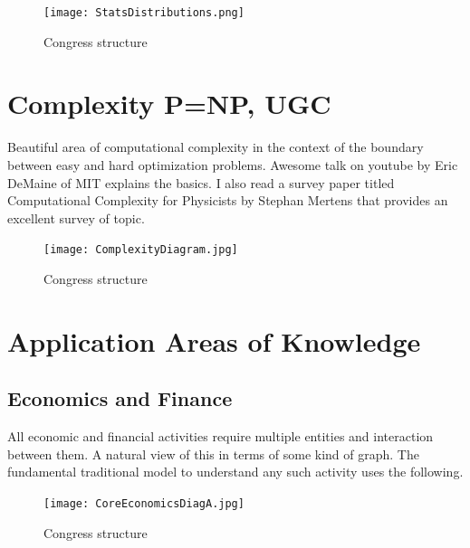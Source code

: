 \documentclass[11pt]{amsart}
\begin{document}
\begin{figure}[H]
\centering
  \texttt{[image: StatsDistributions.png]}
  \caption{Congress structure}
  \label{fig:congress}
\end{figure}

\section{Complexity P=NP, UGC}
Beautiful area of computational complexity in the context of the boundary between easy and hard optimization problems. Awesome talk on youtube by Eric DeMaine of MIT explains the basics. I also read a survey paper titled Computational Complexity for Physicists by Stephan Mertens that provides an excellent survey of topic. 

\begin{figure}[H]
\centering
  \texttt{[image: ComplexityDiagram.jpg]}
  \caption{Congress structure}
  \label{fig:congress}
\end{figure}

\section{Application Areas of Knowledge}
\subsection{Economics and Finance}
All economic and financial activities require multiple entities and interaction between them. A natural view of this in terms of some kind of graph. The fundamental traditional model to understand any such activity uses the following. 
\begin{figure}[H]
\centering
  \texttt{[image: CoreEconomicsDiagA.jpg]}
  \caption{Congress structure}
  \label{fig:congress}
\end{figure}
\end{document}
